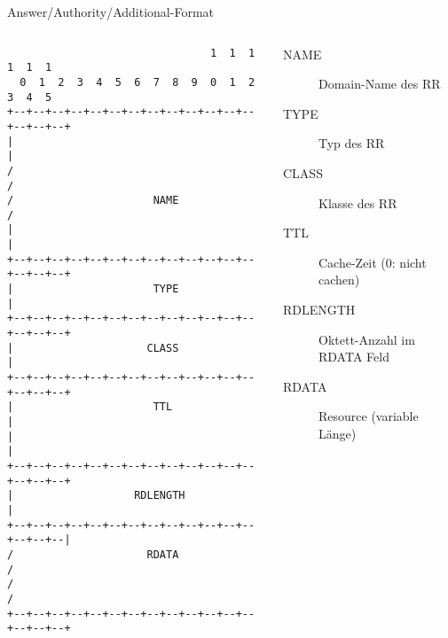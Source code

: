 \documentclass{beamer}
\begin{document}
  \begin{frame}[fragile]{\mytitle}{Answer/Authority/Additional-Format}
    \begin{columns}[c]
      \column{5cm}
      \tiny{
        \begin{verbatim}
                                1  1  1  1  1  1
  0  1  2  3  4  5  6  7  8  9  0  1  2  3  4  5
+--+--+--+--+--+--+--+--+--+--+--+--+--+--+--+--+
|                                               |
/                                               /
/                      NAME                     /
|                                               |
+--+--+--+--+--+--+--+--+--+--+--+--+--+--+--+--+
|                      TYPE                     |
+--+--+--+--+--+--+--+--+--+--+--+--+--+--+--+--+
|                     CLASS                     |
+--+--+--+--+--+--+--+--+--+--+--+--+--+--+--+--+
|                      TTL                      |
|                                               |
+--+--+--+--+--+--+--+--+--+--+--+--+--+--+--+--+
|                   RDLENGTH                    |
+--+--+--+--+--+--+--+--+--+--+--+--+--+--+--+--|
/                     RDATA                     /
/                                               /
+--+--+--+--+--+--+--+--+--+--+--+--+--+--+--+--+
        \end{verbatim}
      }
      \column{7cm}
        \footnotesize{
       \begin{description}
          \item[NAME] Domain-Name des RR
          \item[TYPE] Typ des RR
          \item[CLASS] Klasse des RR
          \item[TTL] Cache-Zeit (0: nicht cachen)
          \item[RDLENGTH] Oktett-Anzahl im RDATA Feld
          \item[RDATA] Resource (variable Länge)
        \end{description}
      }
    \end{columns}
\end{frame}
\end{document}
